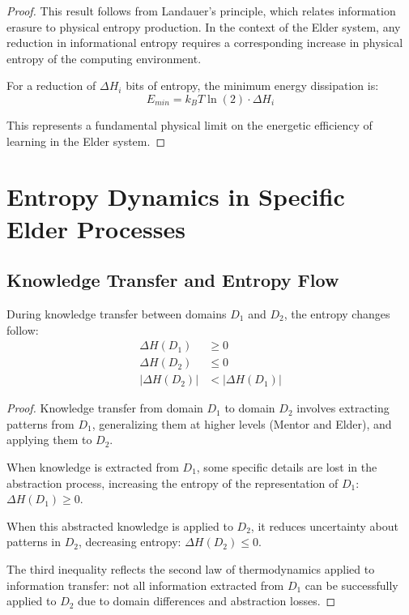 \begin{proof}
This result follows from Landauer's principle, which relates information erasure to physical entropy production. In the context of the Elder system, any reduction in informational entropy requires a corresponding increase in physical entropy of the computing environment.

For a reduction of $\Delta H_i$ bits of entropy, the minimum energy dissipation is:
\begin{equation}
E_{min} = k_B T \ln(2) \cdot \Delta H_i
\end{equation}

This represents a fundamental physical limit on the energetic efficiency of learning in the Elder system.
\end{proof}

\section{Entropy Dynamics in Specific Elder Processes}

\subsection{Knowledge Transfer and Entropy Flow}

\begin{theorem}
During knowledge transfer between domains $D_1$ and $D_2$, the entropy changes follow:
\begin{align}
\Delta H(D_1) &\geq 0 \\
\Delta H(D_2) &\leq 0 \\
|\Delta H(D_2)| &< |\Delta H(D_1)|
\end{align}
\end{theorem}

\begin{proof}
Knowledge transfer from domain $D_1$ to domain $D_2$ involves extracting patterns from $D_1$, generalizing them at higher levels (Mentor and Elder), and applying them to $D_2$.

When knowledge is extracted from $D_1$, some specific details are lost in the abstraction process, increasing the entropy of the representation of $D_1$: $\Delta H(D_1) \geq 0$.

When this abstracted knowledge is applied to $D_2$, it reduces uncertainty about patterns in $D_2$, decreasing entropy: $\Delta H(D_2) \leq 0$.

The third inequality reflects the second law of thermodynamics applied to information transfer: not all information extracted from $D_1$ can be successfully applied to $D_2$ due to domain differences and abstraction losses.
\end{proof}

